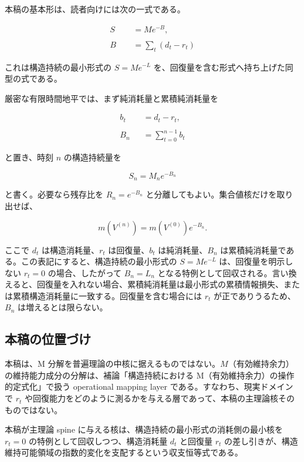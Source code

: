 \documentclass[12pt,a4paper]{article}
\begin{document}
本稿の基本形は、読者向けには次の一式である。

\[
\begin{aligned}
S &= M e^{-B}, \\
\qquad \\
B &= \sum_{t}(d_{t}-r_{t})
\end{aligned}
\]

これは構造持続の最小形式の \(S=Me^{-L}\) を、回復量を含む形式へ持ち上げた同型の式である。

厳密な有限時間地平では、まず純消耗量と累積純消耗量を

\[
\begin{aligned}
b_{t} &= d_{t} - r_{t}, \\
\qquad \\
B_{n} &= \sum_{t=0}^{n-1} b_{t}
\end{aligned}
\]

と置き、時刻 \(n\) の構造持続量を

\[
S_{n} = M_{n} e^{-B_{n}}
\]

と書く。必要なら残存比を \(R_{n}=e^{-B_{n}}\) と分離してもよい。集合値核だけを取り出せば、

\[
m(V^{(n)}) = m(V^{(0)}) e^{-B_{n}}.
\]

ここで \(d_{t}\) は構造消耗量、\(r_{t}\) は回復量、\(b_{t}\) は純消耗量、\(B_{n}\) は累積純消耗量である。この表記にすると、構造持続の最小形式の \(S=Me^{-L}\) は、回復量を明示しない \(r_{t}=0\) の場合、したがって \(B_{n}=L_{n}\) となる特例として回収される。言い換えると、回復量を入れない場合、累積純消耗量は最小形式の累積情報損失、または累積構造消耗量に一致する。回復量を含む場合には \(r_{t}\) が正でありうるため、\(B_{n}\) は増えるとは限らない。

\subsection{本稿の位置づけ}\label{ux672cux7a3fux306eux4f4dux7f6eux3065ux3051}

本稿は、M 分解を普遍理論の中核に据えるものではない。\(M\)（有効維持余力）の維持能力成分の分解は、補論「構造持続における M（有効維持余力）の操作的定式化」で扱う operational mapping layer である。すなわち、現実ドメインで \(r_{t}\) や回復能力をどのように測るかを与える層であって、本稿の主理論核そのものではない。

本稿が主理論 spine に与える核は、構造持続の最小形式の消耗側の最小核を \(r_{t}=0\) の特例として回収しつつ、構造消耗量 \(d_{t}\) と回復量 \(r_{t}\) の差し引きが、構造維持可能領域の指数的変化を支配するという収支恒等式である。
\end{document}
